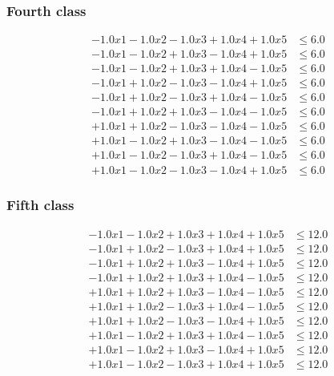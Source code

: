 \documentclass{beamer}
\begin{document}
\begin{frame}
  \frametitle{Fourth class}
  \begin{align*}
-1.0 x1   -1.0 x2   -1.0 x3   +1.0 x4   +1.0 x5   &\le 6.0 \\
-1.0 x1   -1.0 x2   +1.0 x3   -1.0 x4   +1.0 x5   &\le 6.0 \\
-1.0 x1   -1.0 x2   +1.0 x3   +1.0 x4   -1.0 x5   &\le 6.0 \\
-1.0 x1   +1.0 x2   -1.0 x3   -1.0 x4   +1.0 x5   &\le 6.0 \\
-1.0 x1   +1.0 x2   -1.0 x3   +1.0 x4   -1.0 x5   &\le 6.0 \\
-1.0 x1   +1.0 x2   +1.0 x3   -1.0 x4   -1.0 x5   &\le 6.0 \\
+1.0 x1   +1.0 x2   -1.0 x3   -1.0 x4   -1.0 x5   &\le 6.0 \\
+1.0 x1   -1.0 x2   +1.0 x3   -1.0 x4   -1.0 x5   &\le 6.0 \\
+1.0 x1   -1.0 x2   -1.0 x3   +1.0 x4   -1.0 x5   &\le 6.0 \\
+1.0 x1   -1.0 x2   -1.0 x3   -1.0 x4   +1.0 x5   &\le 6.0 
  \end{align*}
\end{frame}

\begin{frame}
  \frametitle{Fifth class}
  \begin{align*}
-1.0 x1   -1.0 x2   +1.0 x3   +1.0 x4   +1.0 x5   &\le 12.0 \\
-1.0 x1   +1.0 x2   -1.0 x3   +1.0 x4   +1.0 x5   &\le 12.0 \\
-1.0 x1   +1.0 x2   +1.0 x3   -1.0 x4   +1.0 x5   &\le 12.0 \\
-1.0 x1   +1.0 x2   +1.0 x3   +1.0 x4   -1.0 x5   &\le 12.0 \\
+1.0 x1   +1.0 x2   +1.0 x3   -1.0 x4   -1.0 x5   &\le 12.0 \\
+1.0 x1   +1.0 x2   -1.0 x3   +1.0 x4   -1.0 x5   &\le 12.0 \\
+1.0 x1   +1.0 x2   -1.0 x3   -1.0 x4   +1.0 x5   &\le 12.0 \\
+1.0 x1   -1.0 x2   +1.0 x3   +1.0 x4   -1.0 x5   &\le 12.0 \\
+1.0 x1   -1.0 x2   +1.0 x3   -1.0 x4   +1.0 x5   &\le 12.0 \\
+1.0 x1   -1.0 x2   -1.0 x3   +1.0 x4   +1.0 x5   &\le 12.0 
  \end{align*}
\end{frame}
\end{document}
